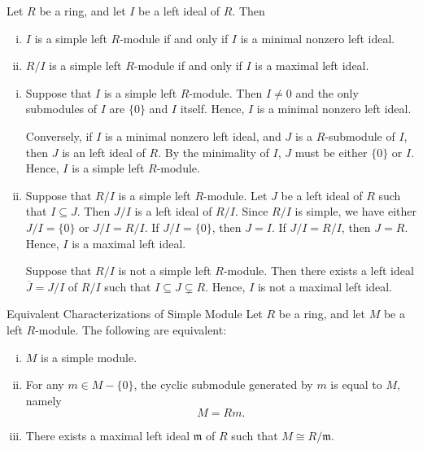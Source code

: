 \begin{proposition}{}{}
    Let $R$ be a ring, and let $I$ be a left ideal of $R$. Then
    \begin{enumerate}[(i)]
        \item $I$ is a simple left $R$-module if and only if $I$ is a minimal nonzero left ideal.
        \item $R/I$ is a simple left $R$-module if and only if $I$ is a maximal left ideal.
    \end{enumerate}
\end{proposition}
\begin{prf}
    \begin{enumerate}[(i)]
        \item Suppose that $I$ is a simple left $R$-module. Then $I\neq 0$ and the only submodules of $I$ are $\{0\}$ and $I$ itself. Hence, $I$ is a minimal nonzero left ideal. 
        
        Conversely, if $I$ is a minimal nonzero left ideal, and $J$ is a $R$-submodule of $I$, then $J$ is an left ideal of $R$. By the minimality of $I$, $J$ must be either $\{0\}$ or $I$. Hence, $I$ is a simple left $R$-module.

        \item Suppose that $R/I$ is a simple left $R$-module. Let $J$ be a left ideal of $R$ such that $I\subseteq J$. Then $J/I$ is a left ideal of $R/I$. Since $R/I$ is simple, we have either $J/I=\{0\}$ or $J/I=R/I$. If $J/I=\{0\}$, then $J=I$. If $J/I=R/I$, then $J=R$. Hence, $I$ is a maximal left ideal. 

        Suppose that $R/I$ is not a simple left $R$-module. Then there exists a left ideal $\overline{J}=J/I$ of $R/I$ such that $I\subseteq J\subsetneq R$. Hence, $I$ is not a maximal left ideal.
    \end{enumerate}
\end{prf}

\begin{proposition}{Equivalent Characterizations of Simple Module}{}
    Let $R$ be a ring, and let $M$ be a left $R$-module. The following are equivalent:
    \begin{enumerate}[(i)]
        \item $M$ is a simple module.
        \item For any $m\in M-\{0\}$, the cyclic submodule generated by $m$ is equal to $M$, namely
        \[
            M=Rm.
        \]
        \item There exists a maximal left ideal $\mathfrak{m}$ of $R$ such that $M\cong R/\mathfrak{m}$.
    \end{enumerate}
    
\end{proposition}

